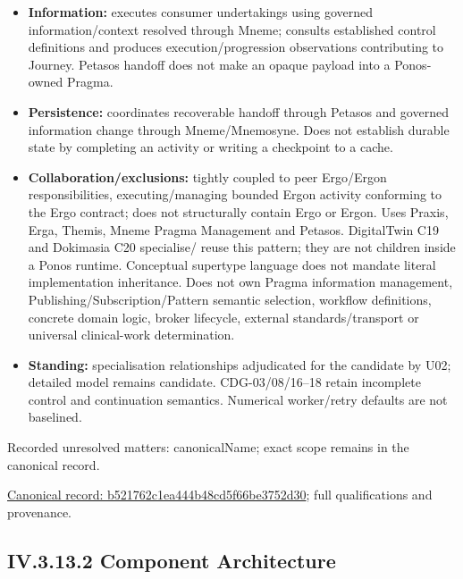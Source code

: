 \begin{itemize}
\item \textbf{Information:} executes consumer undertakings using governed information/context
  resolved through Mneme; consults established control definitions and produces
  execution/progression observations contributing to Journey. Petasos handoff
  does not make an opaque payload into a Ponos-owned Pragma.

\item \textbf{Persistence:} coordinates recoverable handoff through Petasos and governed
  information change through Mneme/Mnemosyne. Does not establish durable state
  by completing an activity or writing a checkpoint to a cache.

\item \textbf{Collaboration/exclusions:} tightly coupled to peer Ergo/Ergon responsibilities,
  executing/managing bounded Ergon activity conforming to the Ergo contract;
  does not structurally contain Ergo or Ergon. Uses Praxis, Erga, Themis, Mneme
  Pragma Management and Petasos. DigitalTwin C19 and Dokimasia C20 specialise/
  reuse this pattern; they are not children inside a Ponos runtime. Conceptual
  supertype language does not mandate literal implementation inheritance.
  Does not own Pragma information management, Publishing/Subscription/Pattern
  semantic selection, workflow definitions, concrete domain logic, broker lifecycle,
  external standards/transport or universal clinical-work determination.

\item \textbf{Standing:} specialisation relationships adjudicated for the candidate by U02;
  detailed model remains candidate. CDG-03/08/16–18 retain incomplete control
  and continuation semantics. Numerical worker/retry defaults are not baselined.

\end{itemize}

{\small Recorded unresolved matters: canonicalName; exact scope remains in the canonical record.}\par
{\footnotesize \href{../../../../continuum/application/application-component/b521762c1ea444b48cd5f66be3752d30.md}{Canonical record: b521762c1ea444b48cd5f66be3752d30}; full qualifications and provenance.}\par
\subsection*{IV.3.13.2 Component Architecture}
\label{navigation:IV.3.13.2}

